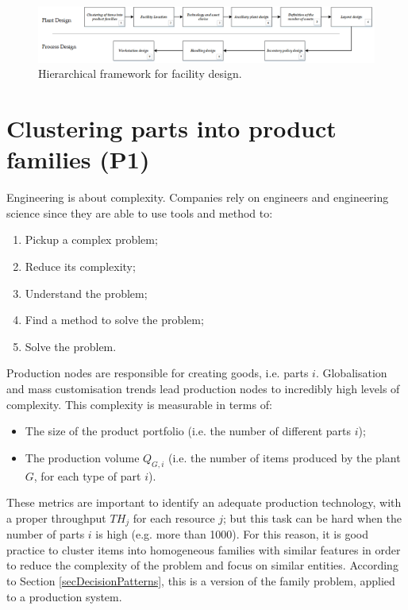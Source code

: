 \begin{figure}[hbt!]
\centering
\includegraphics[width=1\textwidth]{sectionProduction/design_plant_figures/fig_prod_plant_design.png}
\captionsetup{type=figure}
\caption{Hierarchical framework for facility design.}
\label{fig_prod_plant_design}
\end{figure}



\section{Clustering parts into product families (P1)} \label{secClusteringParts}
Engineering is about complexity. Companies rely on engineers and engineering science since they are able to use tools and method to:

\begin{enumerate}
    \item Pickup a complex problem;
    \item Reduce its complexity;
    \item Understand the problem;
    \item Find a method to solve the problem;
    \item Solve the problem.

\end{enumerate}

Production nodes are responsible for creating goods, i.e. parts $i$. Globalisation and mass customisation trends lead production nodes to incredibly high levels of complexity. This complexity is measurable in terms of:

\begin{itemize}
    \item 	The size of the product portfolio (i.e. the number of different parts $i$);
	\item The production volume $Q_{G,i}$ (i.e. the number of items produced by the plant $G$, for each type of part $i$).

\end{itemize}

These metrics are important to identify an adequate production technology, with a proper throughput $TH_j$ for each resource $j$; but this task can be hard when the number of parts $i$ is high (e.g. more than 1000). For this reason, it is good practice to cluster items into homogeneous families with similar features in order to reduce the complexity of the problem and focus on similar entities. According to Section \ref{secDecisionPatterns}, this is a version of the family problem, applied to a production system.

